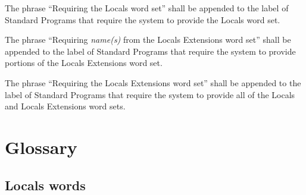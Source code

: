 The phrase ``Requiring the Locals word set'' shall be appended to
the label of Standard Programs that require the system to provide
the Locals word set.

The phrase ``Requiring \emph{name(s)} from the Locals Extensions
word set'' shall be appended to the label of Standard Programs that
require the system to provide portions of the Locals Extensions word
set.

The phrase ``Requiring the Locals Extensions word set'' shall be
appended to the label of Standard Programs that require the system
to provide all of the Locals and Locals Extensions word sets.


\section{Glossary} %

\subsection{Locals words} %

